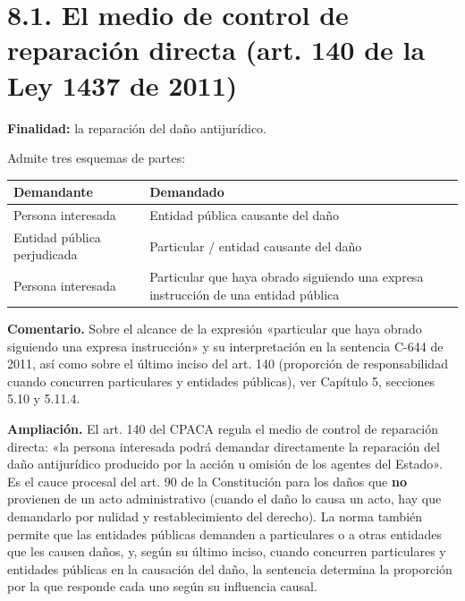 
\section{8.1. El medio de control de reparación directa (art. 140 de la Ley 1437 de 2011)}
\textbf{Finalidad:} la reparación del daño antijurídico.

Admite tres esquemas de partes:

\begin{tabla}
\begin{longtable}{|>{\raggedright\arraybackslash}m{}|>{\raggedright\arraybackslash}m{}|}
\hline
\cellcolor[HTML]{1F3864}\textcolor[HTML]{FFFFFF}{\textbf{Demandante}} & \cellcolor[HTML]{1F3864}\textcolor[HTML]{FFFFFF}{\textbf{Demandado}} \\ \hline
Persona interesada & Entidad pública causante del daño \\ \hline
\cellcolor[HTML]{F2F5FA}Entidad pública perjudicada & \cellcolor[HTML]{F2F5FA}Particular / entidad causante del daño \\ \hline
Persona interesada & Particular que haya obrado siguiendo una expresa instrucción de una entidad pública \\ \hline
\end{longtable}
\end{tabla}
\begin{comentario}
\textcolor[HTML]{8A6D3B}{\textbf{Comentario. }}Sobre el alcance de la expresión «particular que haya obrado siguiendo una expresa instrucción» y su interpretación en la sentencia C-644 de 2011, así como sobre el último inciso del art. 140 (proporción de responsabilidad cuando concurren particulares y entidades públicas), ver Capítulo 5, secciones 5.10 y 5.11.4.
\end{comentario}
\begin{ampliacion}
\textcolor[HTML]{5B3F8C}{\textbf{Ampliación. }}El art. 140 del CPACA regula el medio de control de reparación directa: «la persona interesada podrá demandar directamente la reparación del daño antijurídico producido por la acción u omisión de los agentes del Estado». Es el cauce procesal del art. 90 de la Constitución para los daños que \textbf{no} provienen de un acto administrativo (cuando el daño lo causa un acto, hay que demandarlo por nulidad y restablecimiento del derecho). La norma también permite que las entidades públicas demanden a particulares o a otras entidades que les causen daños, y, según su último inciso, cuando concurren particulares y entidades públicas en la causación del daño, la sentencia determina la proporción por la que responde cada uno según su influencia causal.
\end{ampliacion}
